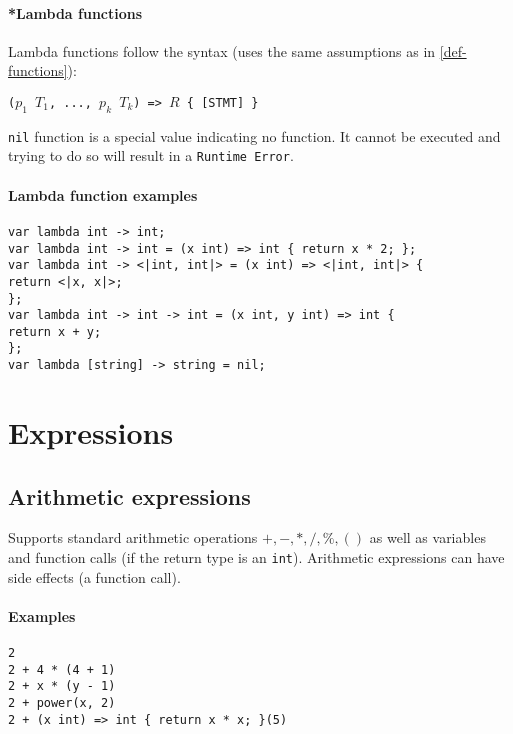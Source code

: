 \documentclass{article}
\begin{document}
\paragraph{*Lambda functions}
Lambda functions follow the syntax (uses the same assumptions as in \ref{def-functions}):

\texttt{($p_1$ $T_1$, ..., $p_k$ $T_k$) => $R$ \{ [STMT] \}}

\texttt{nil} function is a special value indicating no function. It cannot be
executed and trying to do so will result in a \texttt{Runtime Error}.

\paragraph{Lambda function examples}
\texttt{var lambda int -> int;} \\
\texttt{var lambda int -> int = (x int) => int \{ return x * 2; \};} \\
\texttt{var lambda int -> <|int, int|> = (x int) => <|int, int|> \{ \\
  \hspace*{2em} return <|x, x|>; \\
\};} \\
\texttt{var lambda int -> int -> int = (x int, y int) => int \{ \\
  \hspace*{2em} return x + y; \\
\};} \\
\texttt{var lambda [string] -> string = nil;}

\section{Expressions}

\subsection{Arithmetic expressions}
Supports standard arithmetic operations $+, -, *, /, \%, ()$ as well as
variables and function calls (if the return type is an \texttt{int}). Arithmetic
expressions can have side effects (a function call).

\paragraph{Examples}
\texttt{2} \\
\texttt{2 + 4 * (4 + 1)} \\
\texttt{2 + x * (y - 1)} \\
\texttt{2 + power(x, 2)} \\
\texttt{2 + (x int) => int \{ return x * x; \}(5) }
\end{document}
